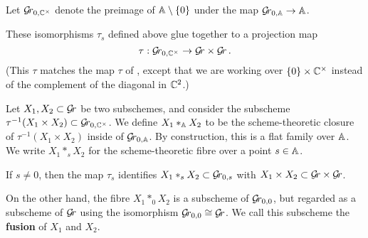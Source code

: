 \documentclass[draft]{article}
\begin{document}
Let $ \Gr_{0, \CC^\times} $ denote the preimage of $\AA \setminus \{0\}$ under the map $\Gr_{0,\AA} \rightarrow \AA $.  


These isomorphisms $ \tau_s $ defined above glue together to a projection map
\begin{equation}
\label{eq:mvitau}
    \tau : \Gr_{0, \CC^\times} \rightarrow \Gr \times \Gr \, .
\end{equation}
(This $\tau$ matches the map $ \tau $ of \cite{mirkovic2007geometric}, except that we are working over $ \{0 \} \times \CC^\times$ instead of the complement of the diagonal in $ \CC^2 $.)


Let $ X_1, X_2 \subset \Gr$ be two subschemes, and consider the subscheme $ \tau^{-1}(X_1 \times X_2) \subset \Gr_{0, \CC^\times} $.
% 
% 
We define $ X_1 \ast_{\AA} X_2 $ to be the scheme-theoretic closure of $  \tau^{-1}(X_1 \times X_2) $ inside of $ \Grbd $.  By construction, this is a flat family over $ \AA$.  We write $X_1 \ast_s X_2 $ for the scheme-theoretic fibre over a point $ s \in \AA$.  

If $ s \ne 0$, then the map $ \tau_s$ identifies $ X_1 \ast_s X_2 \subset \Gr_{0,s}$ with $ X_1 \times X_2 \subset \Gr \times \Gr$.

On the other hand, the fibre $ X_1 \ast_0 X_2$ is a subscheme of $ \Gr_{0,0} $, but regarded as a subscheme of $ \Gr $ using {the isomorphism} $\Gr_{0,0} \cong \Gr $.  We call this subscheme the \textbf{fusion} of $ X_1 $ and $ X_2$.


% 
\end{document}
